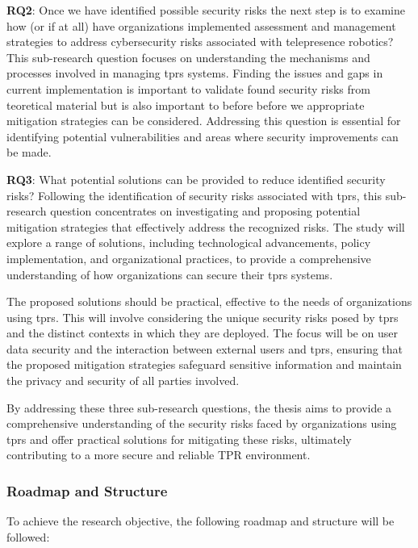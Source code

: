 \textbf{RQ2}: Once we have identified possible security risks the next step is to examine how (or if at all) have organizations implemented assessment and management strategies to address cybersecurity risks associated
  with telepresence robotics? This sub-research question focuses on understanding the mechanisms and processes involved in managing \ac{tprs} systems. Finding the issues and gaps in current implementation is important to validate found security risks from teoretical material but is also important to before before we appropriate mitigation strategies can be considered.  Addressing this question is essential for identifying potential vulnerabilities and areas where security improvements can be made.

\textbf{RQ3}: What potential solutions can be provided to reduce identified security risks?
  Following the identification of security risks associated with \ac{tprs}, this sub-research question concentrates on investigating and proposing potential mitigation strategies that effectively address the recognized risks. The study will explore a range of solutions, including technological advancements, policy implementation, and organizational practices, to provide a comprehensive understanding of how organizations can secure their \ac{tprs} systems.

  The proposed solutions should be practical, effective to the needs of organizations using \ac{tprs}.
  This will involve considering the unique security risks posed by \ac{tprs} and the distinct contexts in which they are deployed.
  The focus will be on user data security and the interaction between external users and \ac{tprs}, ensuring that the proposed mitigation strategies safeguard sensitive information and maintain the privacy and security of all parties involved.


By addressing these three sub-research questions, the thesis aims to provide a comprehensive understanding of the security risks faced by organizations using \ac{tprs} and offer practical solutions for mitigating these risks, ultimately contributing to a more secure and reliable TPR environment.

\subsubsection{Roadmap and Structure}

To achieve the research objective, the following roadmap and structure will be followed:

